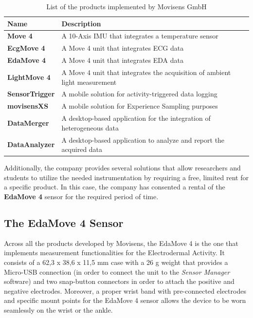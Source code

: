 \begin{table}[H]
\centering
\begin{tabular}{ll}
    \hline
    Name                     &  Description \\
    \hline
    \textbf{Move 4}          & A 10-Axis IMU that integrates a temperature sensor \\
    \textbf{EcgMove 4}       & A Move 4 unit that integrates ECG data \\
    \textbf{EdaMove 4}       & A Move 4 unit that integrates EDA data \\
    \textbf{LightMove 4}     & A Move 4 unit that integrates the acquisition of ambient light measurement \\
    \textbf{SensorTrigger}   & A mobile solution for activity-triggered data logging \\
    \textbf{movisensXS}      & A mobile solution for Experience Sampling purposes \\
    \textbf{DataMerger}      & A desktop-based application for the integration of heterogeneous data \\
    \textbf{DataAnalyzer}    & A desktop-based application to analyze and report the acquired data \\
    \hline
\end{tabular}
\caption{List of the products implemented by Movisens GmbH}
\label{toc:movisens-products}
\end{table}

Additionally, the company provides several solutions that allow researchers and students to utilize the needed instrumentation by requiring a free, limited rent for a specific product. In this case, the company has consented a rental of the \textbf{EdaMove 4} sensor for the required period of time. 

\subsection{The EdaMove 4 Sensor}\label{subsec:edamove4}

Across all the products developed by Movisens, the EdaMove 4 is the one that implements measurement functionalities for the Electrodermal Activity. It consists of a 62,3 x 38,6 x 11,5 mm case with a 26 g weight \cite{edamove4} that provides a Micro-USB connection (in order to connect the unit to the \textit{Sensor Manager} software) and two snap-button connectors in order to attach the positive and negative electrodes. Moreover, a proper wrist band with pre-connected electrodes and specific mount points for the EdaMove 4 sensor allows the device to be worn seamlessly on the wrist or the ankle.


